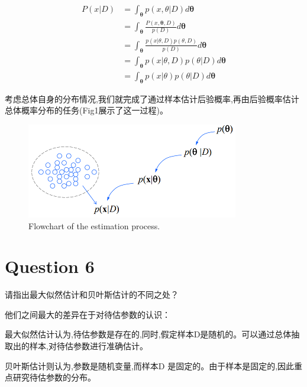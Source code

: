 \documentclass[homework]{IEEEtran}
\begin{document}
\begin{CJK}{UTF8}{gkai}
\begin{enumerate}[计算步骤:]
\begin{equation}
            \begin{aligned}
            P\left(x\vert D\right) &= \int_{\boldsymbol{\theta}} p\left(x,\theta\vert D\right) d \boldsymbol{\theta} \\
                &=\int_{\boldsymbol{\theta}} \frac{P(x,\boldsymbol{\theta},D)}{p(D)}d\boldsymbol{\theta} \\
                &=\int_{\boldsymbol{\theta}} \frac{p(x\vert{\theta,D})p\left(\theta,D\right)}{p(D)}d\boldsymbol{\theta}\\
                &=\int_{\boldsymbol{\theta}} p(x\vert{\theta,D})p\left(\theta\vert D\right)d\boldsymbol{\theta}\\
                &=\int_{\boldsymbol{\theta}} p(x\vert\theta)p\left(\theta\vert D\right)d\boldsymbol{\theta}
            \end{aligned}
            \nonumber
        \end{equation}
    \end{enumerate}\par
    考虑总体自身的分布情况,我们就完成了通过样本估计后验概率,再由后验概率估计总体概率分布的任务(Fig1展示了这一过程)。
\end{CJK}

\begin{figure}[htb]
    \centerline{\includegraphics{Images/fig1.png}}
    \caption{Flowchart of the estimation process.}
    \label{fig}
\end{figure}
\section{Question 6}
\begin{CJK}{UTF8}{gkai}
    请指出最大似然估计和贝叶斯估计的不同之处？ \par
    他们之间最大的差异在于对待估参数的认识：\par 
    最大似然估计认为,待估参数是存在的,同时,假定样本D是随机的。可以通过总体抽取出的样本,对待估参数进行准确估计。\par 
    贝叶斯估计则认为,参数是随机变量,而样本D 是固定的。由于样本是固定的,因此重点研究待估参数的分布。
\end{CJK}
\end{document}
